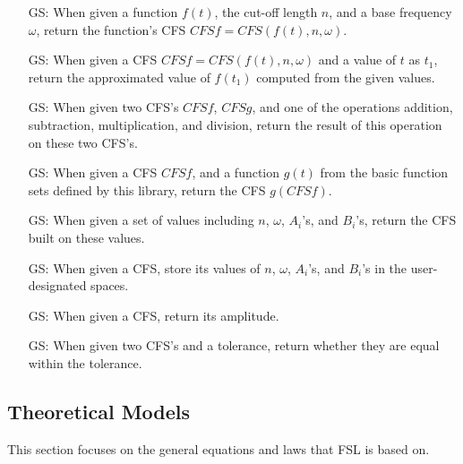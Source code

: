 \documentclass[12pt]{article}
\newcounter{goalnum} %
\newcommand{\famname}{FSL} %
\begin{document}
\begin{itemize}

\item[GS\refstepcounter{goalnum}\thegoalnum \label{GS:ConvertFromFunc}:] 
When given a function $f(t)$, the cut-off length $n$, and a base frequency 
$\omega$, return the function's CFS $\mathit{CFSf}=\mathit{CFS}(f(t), n, \omega)$.
\item[GS\refstepcounter{goalnum}\thegoalnum \label{GS:FuncValue}:] 
When given a CFS $\mathit{CFSf}=\mathit{CFS}(f(t), n, \omega)$ and a value of $t$ as $t_1$, 
return the approximated value of $f(t_1)$ computed from the given values.
\item[GS\refstepcounter{goalnum}\thegoalnum \label{GS:Operation}:] 
When given two CFS's $\mathit{CFSf}$, $\mathit{CFSg}$, and one of the 
operations addition, subtraction, multiplication, and division, return 
the result of this operation on these two CFS's.
\item[GS\refstepcounter{goalnum}\thegoalnum \label{GS:Function}:] 
When given a CFS $\mathit{CFSf}$, and a function $g(t)$ from the basic 
function sets defined by this library, return the CFS $g(CFSf)$. 
\item[GS\refstepcounter{goalnum}\thegoalnum \label{GS:ConvertFromOther}:] 
When given a set of values including $n$, $\omega$, $A_i$'s, and $B_i$'s, 
return the CFS built on these values.
\item[GS\refstepcounter{goalnum}\thegoalnum \label{GS:ConvertToOther}:] 
When given a CFS, store its values of $n$, $\omega$, $A_i$'s, and $B_i$'s 
in the user-designated spaces.
\item[GS\refstepcounter{goalnum}\thegoalnum \label{GS:Amp}:] When given 
a CFS, return its amplitude.
\item[GS\refstepcounter{goalnum}\thegoalnum \label{GS:ToleratedEquality}:] 
When given two CFS's and a tolerance, return whether they are equal 
within the tolerance.
\end{itemize}

\subsection{Theoretical Models} \label{sec_theoretical}

This section focuses on the general equations and laws that \famname{} is based
on.
~\newline
\end{document}
